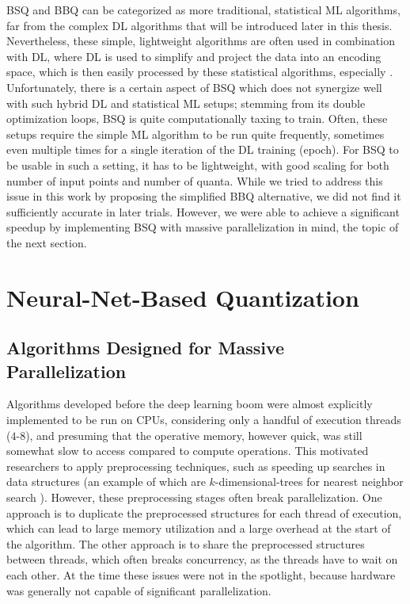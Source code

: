 			\ac{BSQ} and \ac{BBQ} can be categorized as more traditional, statistical \ac{ML} algorithms, far from the complex \ac{DL} algorithms that will be introduced later in this thesis.
			Nevertheless, these simple, lightweight algorithms are often used in combination with \ac{DL}, where \ac{DL} is used to simplify and project the data into an encoding space, which is then easily processed by these statistical algorithms, especially \kmeans{}.
			Unfortunately, there is a certain aspect of \ac{BSQ} which does not synergize well with such hybrid \ac{DL} and statistical \ac{ML} setups; stemming from its double optimization loops, \ac{BSQ} is quite computationally taxing to train.
			Often, these setups require the simple \ac{ML} algorithm to be run quite frequently, sometimes even multiple times for a single iteration of the \ac{DL} training (epoch).
			For \ac{BSQ} to be usable in such a setting, it has to be lightweight, with good scaling for both number of input points and number of quanta.			
			While we tried to address this issue in this work by proposing the simplified \ac{BBQ} alternative, we did not find it sufficiently accurate in later trials.
			However, we were able to achieve a significant speedup by implementing \ac{BSQ} with massive parallelization in mind, the topic of the next section.
			
	\section{Neural-Net-Based Quantization}
		\label{cha:quantization:sec:nn_quant}
			
		\subsection{Algorithms Designed for Massive Parallelization}
			
			Algorithms developed before the deep learning boom were almost explicitly implemented to be run on \acp{CPU}, considering only a handful of execution threads ($4$-$8$), and presuming that the operative memory, however quick, was still somewhat slow to access compared to compute operations.
			This motivated researchers to apply preprocessing techniques, such as speeding up searches in data structures (an example of which are $k$-dimensional-trees for nearest neighbor search \cite{ann}).
			However, these preprocessing stages often break parallelization.
			One approach is to duplicate the preprocessed structures for each thread of execution, which can lead to large memory utilization and a large overhead at the start of the algorithm.
			The other approach is to share the preprocessed structures between threads, which often breaks concurrency, as the threads have to wait on each other.
			At the time these issues were not in the spotlight, because hardware was generally not capable of significant parallelization.
			
